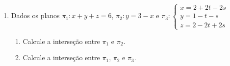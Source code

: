 \documentclass[a4paper,5pt]{amsbook}
\begin{document}
\begin{enumerate}
	\vspace{0.5cm}
	\item Dados os planos $\pi_1: x+y+z=6$, $\pi_2: y=3-x$ e
		$\pi_3: \left\{\begin{array}{l}
			x = 2+2t-2s \\
			y = 1-t-s \\
			z = 2-2t+2s
		\end{array}\right.$
	\begin{enumerate}
		\item Calcule a interse\c{c}\~ao entre $\pi_1$ e $\pi_2$.
		\item Calcule a interse\c{c}\~ao entre $\pi_1$, $\pi_2$ e $\pi_3$.
	\end{enumerate}
\end{enumerate}
\end{document}

